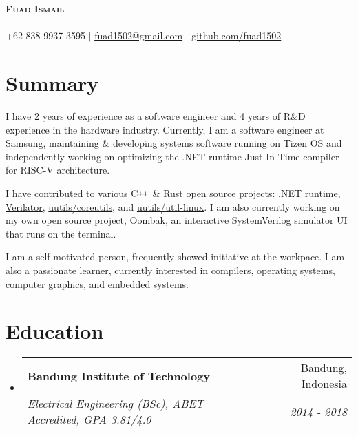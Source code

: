 \documentclass[letterpaper,11pt]{article}
\makeatletter
\newcommand{\resumeSubheading}[4]{
  \vspace{-2pt}\item
    \begin{tabular*}{0.97\textwidth}[t]{l@{\extracolsep{\fill}}r}
      \textbf{#1} & #2 \\
      \textit{\small#3} & \textit{\small #4} \\
    \end{tabular*}\vspace{-7pt}
}
\newcommand{\resumeSubHeadingListStart}{\begin{itemize}[leftmargin=0.15in, label={}]}
\newcommand{\resumeSubHeadingListEnd}{\end{itemize}}
\newcommand{\githubPRs}[2]{\href{https://github.com/#1/pulls?q=is\%3Apr+author\%3Afuad1502}{#2}}
\newcommand\CC{C\texttt{++}}
\makeatother
\begin{document}
\begin{center}
	\textbf{\Huge \scshape Fuad Ismail} \\
	\vspace{1pt} \small \textit{} \\
	+62-838-9937-3595 $|$ \href{mailto:fuad1502@gmail.com}{fuad1502@gmail.com} $|$ \href{https://github.com/fuad1502}{github.com/fuad1502}
\end{center}

\section*{Summary}
\justifying

I have 2 years of experience as a software engineer and 4 years of R\&D
experience in the hardware industry. Currently, I am a software engineer at
Samsung, maintaining \& developing systems software running on Tizen OS and
independently working on optimizing the .NET runtime Just-In-Time compiler for
RISC-V architecture.

I have contributed to various \CC\ \& Rust open source projects:
\githubPRs{dotnet/runtime}{.NET runtime},
\githubPRs{verilator/verilator}{Verilator},
\githubPRs{uutils/coreutils}{uutils/coreutils}, and
\githubPRs{uutils/util-linux}{uutils/util-linux}. I am also currently working
on my own open source project,
\href{https://github.com/fuad1502/oombak}{Oombak}, an interactive SystemVerilog
simulator UI that runs on the terminal.

I am a self motivated person, frequently showed initiative at the workpace. I
am also a passionate learner, currently interested in compilers, operating
systems, computer graphics, and embedded systems.

\section{Education}
\resumeSubHeadingListStart
\resumeSubheading
{Bandung Institute of Technology}{Bandung, Indonesia}
{Electrical Engineering (BSc), ABET Accredited, GPA 3.81/4.0}{2014 - 2018}
\resumeSubHeadingListEnd

\end{document}
